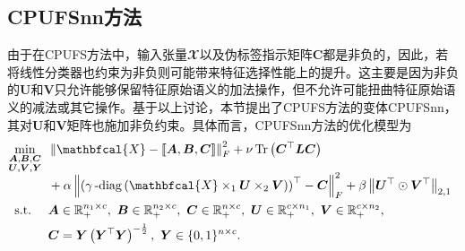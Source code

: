 \subsection{CPUFSnn方法}
由于在CPUFS方法中，输入张量$\mathbfcal{X}$以及伪标签指示矩阵$\boldsymbol{C}$都是非负的，因此，若将线性分类器也约束为非负则可能带来特征选择性能上的提升。这主要是因为非负的$\boldsymbol{U}$和$\boldsymbol{V}$只允许能够保留特征原始语义的加法操作，但不允许可能扭曲特征原始语义的减法或其它操作。基于以上讨论，本节提出了CPUFS方法的变体CPUFSnn，其对$\boldsymbol{U}$和$\boldsymbol{V}$矩阵也施加非负约束。具体而言，CPUFSnn方法的优化模型为
\begin{equation*}
    \begin{aligned}
    & \underset{\smash[b]{\substack{\mathclap{\boldsymbol{A},\boldsymbol{B},\boldsymbol{C}}\\\mathclap{\boldsymbol{U},\boldsymbol{V},\boldsymbol{Y}}}}}{\min}
    & &  \norm{\mathbfcal{X}-\left\llbracket \boldsymbol{A}, \boldsymbol{B}, \boldsymbol{C} \right\rrbracket}_{F}^{2} + \nu\operatorname{Tr}\left(\boldsymbol{C}^{\top}\boldsymbol{L}\boldsymbol{C}\right) \\ \span&& + \alpha\norm{\left(\mydiag\left(\mathbfcal{X}\times_{1}\boldsymbol{U}\times_{2}\boldsymbol{V}\right)\right)^{\top} - \boldsymbol{C}}_{F}^{2} + \beta \norm{\boldsymbol{U}^{\top}\odot\boldsymbol{V}^{\top}}_{2,1}\\
    & \text{s.t.}
& & \boldsymbol{A}\in \mathbb{R}_{+}^{n_1 \times c},~\boldsymbol{B}\in \mathbb{R}_{+}^{n_2 \times c},~\boldsymbol{C}\in \mathbb{R}_{+}^{n \times c},~\boldsymbol{U}\in \mathbb{R}_{+}^{c \times n_1},~\boldsymbol{V}\in \mathbb{R}_{+}^{c \times n_2},\\\span&&\boldsymbol{C}=\boldsymbol{Y}\left(\boldsymbol{Y}^{\top} \boldsymbol{Y}\right)^{-\frac{1}{2}},~\boldsymbol{Y}\in\{0,1\}^{n\times c}.
    \end{aligned}
\end{equation*}

